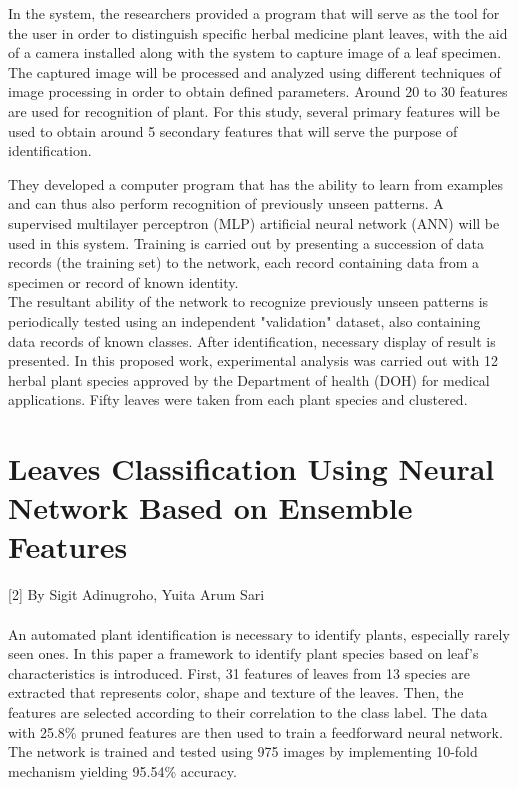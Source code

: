 In the system, the researchers provided a program that will
serve as the tool for the user in order to distinguish specific
herbal medicine plant leaves, with the aid of a camera installed
along with the system to capture image of a leaf specimen. The
captured image will be processed and analyzed using different
techniques of image processing in order to obtain defined
parameters. Around 20 to 30 features
are used for recognition of plant. For this study, several
primary features will be used to obtain around 5 secondary
features that will serve the purpose of identification.

They developed a computer program that has the ability to
learn from examples and can thus also perform recognition of
previously unseen patterns. A supervised multilayer perceptron
(MLP) artificial neural network (ANN) will be used in this
system. Training is carried out by presenting a succession of
data records (the training set) to the network, each record
containing data from a specimen or record of known identity.\\

The resultant ability of the network to recognize previously
unseen patterns is periodically tested using an independent
"validation" dataset, also containing data records of known
classes. After identification, necessary display of
result is presented. In this proposed work, experimental
analysis was carried out with 12 herbal plant species approved
by the Department of health (DOH) for medical applications.
Fifty leaves were taken from each plant
species and clustered.

\section{Leaves Classification Using Neural Network Based on Ensemble Features }
[2] By Sigit Adinugroho, Yuita Arum Sari
\paragraph{}
An automated plant identification is necessary to identify plants, especially rarely seen ones. In this paper a framework to identify plant species based on leaf's characteristics is introduced. First, 31 features of leaves from 13 species are extracted that represents color, shape and texture of the leaves. Then, the features are selected according to their correlation to the class label. The data with 25.8\% pruned features are then used to train a feedforward neural network. The network is trained and tested using 975 images by implementing 10-fold mechanism yielding 95.54\% accuracy.

